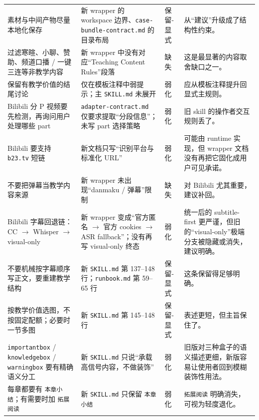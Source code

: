 \documentclass[a4paper]{article}
\begin{document}
\begin{longtable}{p{3.1cm}p{5.1cm}p{1.8cm}p{4.7cm}}
素材与中间产物尽量本地化保存 & 新 wrapper 的 workspace 边界、\texttt{case-bundle-contract.md} 的目录布局 & 保留-显式 & 从“建议”升级成了结构性约束。 \\

过滤寒暄、小聊、赞助、频道口播 / 一键三连等非教学内容 & 新 wrapper 中没有对应“Teaching Content Rules”段落 & 缺失 & 这是最显著的内容取舍缺口之一。 \\

保留有教学价值的结尾讨论 & 仅在模板注释中弱提示；主 \texttt{SKILL.md} 未展开 & 弱化 & 应从模板注释提升回显式主规则。 \\

Bilibili 分 P 视频要先检测，再询问用户处理哪些 part & \texttt{adapter-contract.md} 仅要求提取“分段信息”；未写 part 选择策略 & 弱化 & 旧 skill 的操作者交互规则丢了。 \\

Bilibili 要支持 \texttt{b23.tv} 短链 & 新文档只写“识别平台与标准化 URL” & 弱化 & 可能由 runtime 实现，但 wrapper 文档没有再把它固化成用户可见承诺。 \\

不要把弹幕当教学内容来源 & 新 wrapper 未出现“danmaku / 弹幕”限制 & 缺失 & 对 Bilibili 尤其重要，建议补回。 \\

Bilibili 字幕回退链：CC $\rightarrow$ Whisper $\rightarrow$ visual-only & 新 wrapper 变成“官方匿名 $\rightarrow$ 官方 cookies $\rightarrow$ ASR fallback”；没有再写 visual-only 终态 & 弱化 & 统一后的 subtitle-first 更严谨，但旧的“visual-only”极端分支被隐藏或消失，建议明确。 \\

不要机械按字幕顺序写正文，要重建教学结构 & 新 \texttt{SKILL.md} 第 137--148 行；\texttt{runbook.md} 第 59--65 行 & 保留-显式 & 这条保留得足够明确。 \\

按教学价值选图，不按固定配额；必要时一节多图 & 新 \texttt{SKILL.md} 第 145--148 行 & 保留-显式 & 表述更短，但主旨保住了。 \\

\texttt{importantbox} / \texttt{knowledgebox} / \texttt{warningbox} 要有精确语义分工 & 新 \texttt{SKILL.md} 只说“承载高信号内容，不做装饰” & 弱化 & 旧版对三种盒子的语义描述更细，新版容易让使用者回到模糊装饰性用法。 \\

每章都要有 \texttt{本章小结}；有需要时加 \texttt{拓展阅读} & 新 \texttt{SKILL.md} 只保留 \texttt{本章小结} & 弱化 & \texttt{拓展阅读} 明确消失，可视为轻度退化。 \\


\end{longtable}
\end{document}
